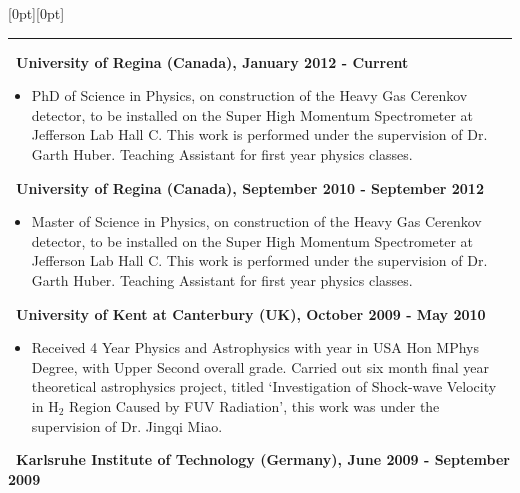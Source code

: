 \documentclass[letterpaper,12pt]{letter}
\begin{document}
\secb


\raisebox{0pt}[0pt][0pt]{\Large\textbf{\raisebox{-3.5ex}{History of Study}}} 
\\[2mm]
\rule[-0.5cm]{10cm}{1pt}

\vspace{2mm}

\textbf{\normalsize ~University of Regina (Canada), January 2012 - Current} \\[-8mm]
\begin{itemize}
\item \textrm{\normalsize PhD of Science in Physics, on construction of the Heavy Gas Cerenkov detector, to be installed on the Super High Momentum Spectrometer at Jefferson Lab Hall C.  This work is performed under the supervision of Dr. Garth Huber. Teaching Assistant for first year physics classes.}  
\end{itemize}

\textbf{\normalsize ~University of Regina (Canada), September 2010 - September 2012} \\[-8mm]
\begin{itemize}
\item \textrm{\normalsize Master of Science in Physics, on construction of the Heavy Gas Cerenkov detector, to be installed on the Super High Momentum Spectrometer at Jefferson Lab Hall C.  This work is performed under the supervision of Dr. Garth Huber. Teaching Assistant for first year physics classes.}  
\end{itemize}

\textbf{\normalsize ~University of Kent at Canterbury (UK), October 2009 - May 2010} \\[-8mm]
\begin{itemize}
\item \textrm{\normalsize Received 4 Year Physics and Astrophysics with year in USA Hon MPhys Degree, with Upper Second overall grade. Carried out six month final year theoretical astrophysics project, titled \lq Investigation of Shock-wave Velocity in H$_2$ Region Caused by FUV Radiation\rq, this work was under the supervision of Dr. Jingqi Miao.} 
\end{itemize}

\textbf{\normalsize ~Karlsruhe Institute of Technology (Germany), June 2009 - September 2009} \\[-8mm] 
\end{document}
